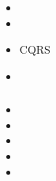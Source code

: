 \hypertarget{section-9}{%
\subsubsection{}\label{section-9}}

\begin{itemize}
\item
  \important{}
\item
  \important{}
\item
  \important{}CQRS
\item
  \important{}
\end{itemize}

\hypertarget{section-10}{%
\subsubsection{}\label{section-10}}

\begin{itemize}
\item
  \important{}
\item
  \important{}
\item
  \important{}
\item
  \important{}
\item
  \important{}
\end{itemize}

\hypertarget{section-11}{%
\subsection{}\label{section-11}}

\hypertarget{section-12}{%
\subsubsection{}\label{section-12}}

